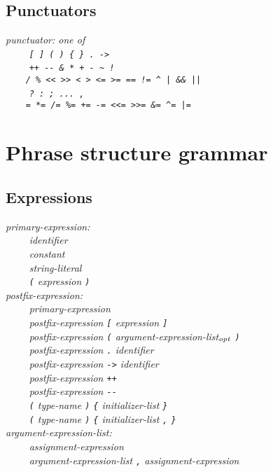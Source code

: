 \documentclass[12pt]{report}
\def\|{\verb|}
\newcommand\opt{$_{{\it opt}}$ }
\begin{document}
\rm
\section{Punctuators}
\it
\noindent
punctuator: {\rm one of}\\
\|    | \verb+[ ] ( ) { } . ->+\\
\|    | \verb|++ -- & * + - ~ !|\\
\|    | \verb+/ % << >> < > <= >= == != ^ | && ||+\\
\|    | \verb+? : ; ... ,+\\
\|    | \verb#= *= /= %= += -= <<= >>= &= ^= |=#\\

\rm
\chapter{Phrase structure grammar}
\section{Expressions}
\it
\noindent
primary-expression:\\
\|    | identifier\\
\|    | constant\\
\|    | string-literal\\
\|    | \verb+(+ expression \verb+)+\\

\noindent
postfix-expression:\\
\|    | primary-expression\\
\|    | postfix-expression \verb+[+ expression \verb+]+\\
\|    | postfix-expression \verb+(+ argument-expression-list\opt \verb+)+\\
\|    | postfix-expression \verb+.+ identifier\\
\|    | postfix-expression \verb+->+ identifier\\
\|    | postfix-expression \verb|++|\\
\|    | postfix-expression \verb+--+\\
\|    | \verb+(+ type-name \verb+)+ \verb+{+ initializer-list \verb+}+\\
\|    | \verb+(+ type-name \verb+)+ \verb+{+ initializer-list \verb+,+ \verb+}+\\

\noindent
argument-expression-list:\\
\|    | assignment-expression\\
\|    | argument-expression-list \verb+,+ assignment-expression\\
\end{document}
